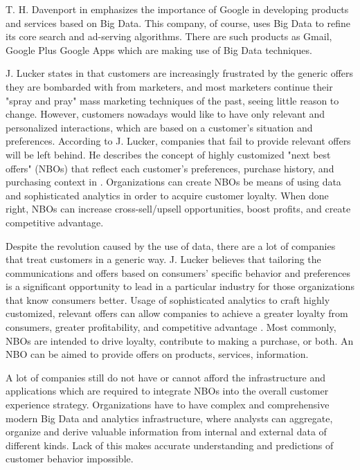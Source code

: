 \documentclass[runningheads]{llncs}
\begin{document}
\begin{enumerate}
T. H. Davenport in \cite{DAVENPORT} emphasizes the importance of Google in developing products and services based on Big Data. This company, of course, uses Big Data to refine its core search and ad-serving algorithms. There are such products as Gmail, Google Plus Google Apps which are making use of Big Data techniques. 

J. Lucker states in \cite{HBR} that customers are increasingly frustrated by the generic offers they are bombarded with from marketers, and most marketers continue their "spray and pray" mass marketing techniques of the past, seeing little reason to change. However, customers nowadays would like to have only relevant and personalized interactions, which are based on a customer's situation and preferences. According to J. Lucker, companies that fail to provide relevant offers will be left behind. He describes the concept of highly customized "next best offers" (NBOs) that reflect each customer's preferences, purchase history, and purchasing context in \cite{HBR}. Organizations can create NBOs be means of using data and sophisticated analytics in order to acquire customer loyalty. When done right, NBOs can increase cross-sell/upsell opportunities, boost profits, and create competitive advantage.

Despite the revolution caused by the use of data, there are a lot of companies that treat customers in a generic way. J. Lucker believes that tailoring the communications and offers based on consumers' specific behavior and preferences is a significant opportunity to lead in a particular industry for those organizations that know consumers better. Usage of sophisticated analytics to craft highly customized, relevant offers can allow companies to achieve a greater loyalty from consumers, greater profitability, and competitive advantage \cite{HBR}. Most commonly, NBOs are intended to drive loyalty, contribute to making a purchase, or both. An NBO can be aimed to provide offers on products, services, information.

A lot of companies still do not have or cannot afford the infrastructure and applications which are required to integrate NBOs into the overall customer experience strategy. Organizations have to have complex and comprehensive modern Big Data and analytics infrastructure, where analysts can aggregate, organize and derive valuable information from internal and external data of different kinds. Lack of this makes accurate understanding and predictions of customer behavior impossible.\\


\end{enumerate}
\end{document}
